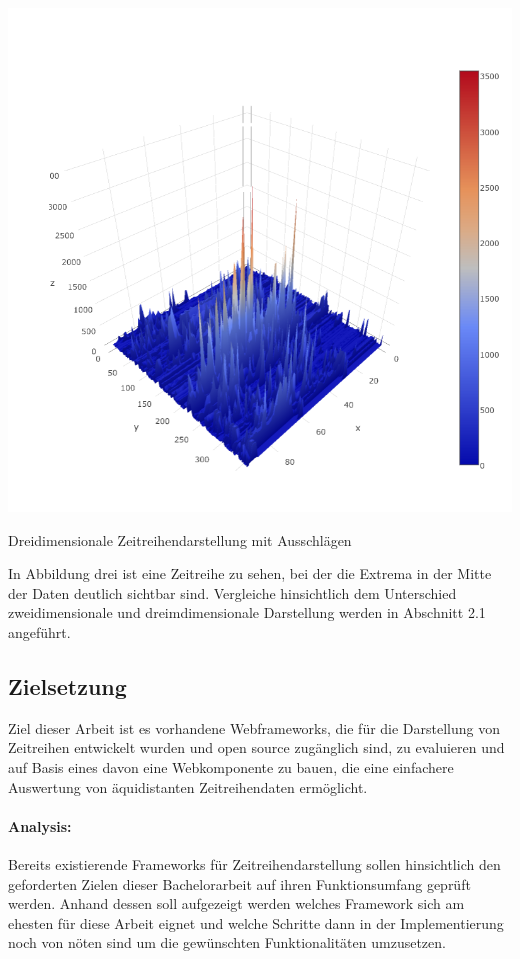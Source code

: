 \documentclass[12pt]{article}
\begin{document}
		\hspace{0pt}
		\begin{floatingfigure}[l]{5cm}
					\includegraphics[scale=0.1]{img/zeitreihe_3D_fehler.png}
					\caption[3D-fehler]{Dreidimensionale
					Zeitreihendarstellung mit Ausschlägen}
			\end{floatingfigure}
		
		In Abbildung drei ist eine Zeitreihe zu sehen, bei der die
		Extrema in der Mitte der Daten deutlich sichtbar sind. Vergleiche
		hinsichtlich dem Unterschied zweidimensionale und dreimdimensionale
		Darstellung werden in Abschnitt 2.1 angeführt.\\
		
		
		\newpage
		
	\subsection{Zielsetzung}
		Ziel dieser Arbeit ist es vorhandene Webframeworks, die für die Darstellung
		von Zeitreihen entwickelt wurden und open source zugänglich sind, zu
		evaluieren und auf Basis eines davon eine Webkomponente zu bauen, die eine
		einfachere Auswertung von äquidistanten Zeitreihendaten ermöglicht.
		\paragraph{Analysis:}
		Bereits existierende Frameworks für Zeitreihendarstellung sollen hinsichtlich 
		den geforderten Zielen dieser Bachelorarbeit auf ihren Funktionsumfang 
		geprüft werden. Anhand dessen soll aufgezeigt werden welches Framework sich
		am ehesten für diese Arbeit eignet und welche Schritte dann in der
		Implementierung noch von nöten sind um die gewünschten Funktionalitäten
		umzusetzen.
\end{document}
